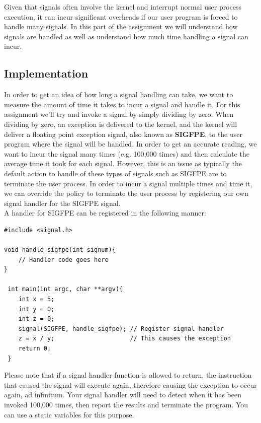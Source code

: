 \documentclass{article}
\begin{document}
Given that signals often involve the kernel and interrupt normal user process execution, it can incur significant overheads if our user program is forced to handle many signals. In this part of the assignment we will understand how signals are handled as well as understand how much time handling a signal can incur. 

\subsection*{Implementation}
In order to get an idea of how long a signal handling can take, we want to measure the amount of time it takes to incur a signal and handle it. For this assignment we'll try and invoke a signal by simply dividing by zero. When dividing by zero, an exception is delivered to the kernel, and the kernel will deliver a floating point exception signal, also known as \textbf{SIGFPE}, to the user program where the signal will be handled. In order to get an accurate reading, we want to incur the signal many times (e.g. 100,000 times) and then calculate the average time it took for each signal. However, this is an issue as typically the default action to handle of these types of signals such as SIGFPE are to terminate the user process. In order to incur a signal multiple times and time it, we can override the policy to terminate the user process by registering our own signal handler for the SIGFPE signal. \\

\noindent A handler for SIGFPE can be registered in the following manner:

\begin{verbatim}
#include <signal.h>
    
void handle_sigfpe(int signum){
    // Handler code goes here
}
    
 int main(int argc, char **argv){
    int x = 5;
    int y = 0;
    int z = 0;
    signal(SIGFPE, handle_sigfpe); // Register signal handler
    z = x / y;                     // This causes the exception
    return 0; 
 }
\end{verbatim}

\begin{info}
Please note that if a signal handler function is allowed to return, the instruction that caused the signal will execute again, therefore causing the exception to occur again, ad infinitum. Your signal handler will need to detect when it has been invoked 100,000 times, then report the results and terminate the program. You can use a static variables for this purpose.
\end{info}
\end{document}
